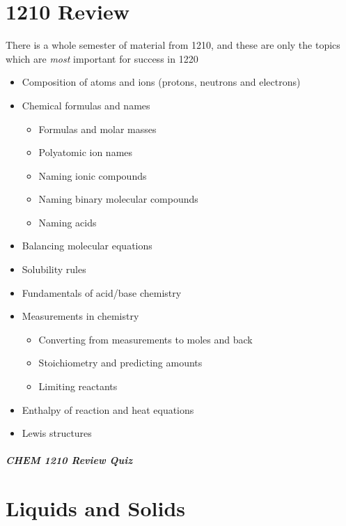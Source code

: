\documentclass[12pt, openany, letterpaper]{memoir}
\begin{document}
\setcounter{chapter}{-1}
\chapter{1210 Review}

There is a whole semester of material from 1210, and these are only the topics which are \emph{most} important for success in 1220

\begin{itemize}
	\item Composition of atoms and ions (protons, neutrons and electrons)
	\item Chemical formulas and names
	\begin{itemize}
		\item Formulas and molar masses
		\item Polyatomic ion names
		\item Naming ionic compounds
		\item Naming binary molecular compounds
		\item Naming acids
	\end{itemize}
	\item Balancing molecular equations
	\item Solubility rules
	\item Fundamentals of acid/base chemistry
	\item Measurements in chemistry
	\begin{itemize}
		\item Converting from measurements to moles and back
		\item Stoichiometry and predicting amounts
		\item Limiting reactants
	\end{itemize}
	\item Enthalpy of reaction and heat equations
	\item Lewis structures
\end{itemize}
\paragraph*{CHEM 1210 Review Quiz}

\setcounter{chapter}{9}
\chapter{Liquids and Solids}
\end{document}
